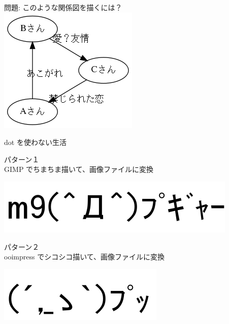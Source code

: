 \documentclass[cjk,dvipdfmx,20pt]{beamer}
\begin{document}
\begin{frame}{}
\begin{center}
問題: このような関係図を描くには？\\
\includegraphics[width=0.5\hsize]{image200812/tl.png}
\end{center}
\end{frame}

\begin{frame}{}
\begin{center}
dot を使わない生活
\end{center}
\end{frame}

\begin{frame}{}
\begin{center}
パターン１\\
GIMP でちまちま描いて、画像ファイルに変換
\end{center}
\end{frame}

\begin{frame}{}
\begin{center}
\includegraphics[width=0.6\hsize]{image200812/pugya.png}
\end{center}
\end{frame}


\begin{frame}{}
\begin{center}
パターン２\\
ooimpress でシコシコ描いて、画像ファイルに変換
\end{center}
\end{frame}

\begin{frame}{}
\begin{center}
\includegraphics[width=0.5\hsize]{image200812/pu.png}
\end{center}
\end{frame}
\end{document}
